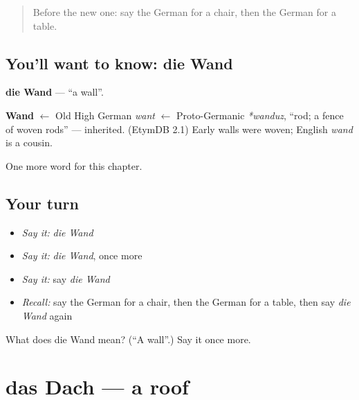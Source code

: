 \label{lesson:GE-C76-wand}



\begin{quote}
Before the new one: say the German for a chair, then the German for a table.
\end{quote}

\subsection*{You'll want to know: die Wand}
\textbf{die Wand} — \textquotedblleft{}a wall\textquotedblright{}.

\begin{cousinweb}
\textbf{Wand} $\leftarrow$ Old High German \emph{want} $\leftarrow$ Proto-Germanic \emph{*wanduz}, \textquotedblleft{}rod; a fence of woven rods\textquotedblright{} — inherited. (EtymDB 2.1) Early walls were woven; English \emph{wand} is a cousin.
\end{cousinweb}

\begin{grammarlens}[title={What you've built}]
One more word for this chapter.
\end{grammarlens}

\subsection*{Your turn}
\begin{itemize}
\raggedright
  \item \emph{Say it:} \emph{die Wand}
  \item \emph{Say it:} \emph{die Wand}, once more
  \item \emph{Say it:} say \emph{die Wand}
  \item \emph{Recall:} say the German for a chair, then the German for a table, then say \emph{die Wand} again
\end{itemize}

\begin{tcolorbox}[breakable,colback=teal!4,colframe=teal!35!black,title={Before you move on}]
What does die Wand mean? (\textquotedblleft{}A wall\textquotedblright{}.) Say it once more.
\end{tcolorbox}
\section[das Dach]{das Dach — a roof}

\label{lesson:GE-C76-dach}



